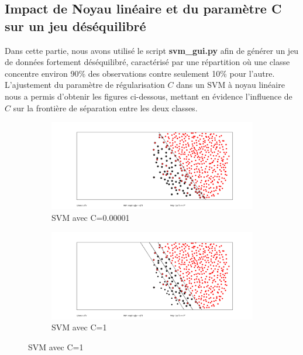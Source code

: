 \documentclass[12pt,a4paper]{report}
\begin{document}
\subsection{Impact de Noyau linéaire et du paramètre C sur un jeu déséquilibré}

Dans cette partie, nous avons utilisé le script \textbf{svm\_gui.py} 
afin de générer un 
jeu de données fortement déséquilibré, caractérisé par une répartition où une classe 
concentre environ 90\% des observations contre seulement 10\% pour l’autre. 
L’ajustement du paramètre de régularisation $C$ dans un SVM à noyau linéaire 
nous a permis d’obtenir les figures ci-dessous, mettant en évidence l’influence de $C$ 
sur la frontière de séparation entre les deux classes.
\begin{figure}[H]
    \centering
    \begin{subfigure}{0.45\linewidth}
        \centering
        \includegraphics[width=\linewidth]{images/c0.00001.png}
        \caption{SVM avec C=0.00001}
        \label{fig:c00001}
    \end{subfigure}
    \hfill
    \begin{subfigure}{0.45\linewidth}
        \centering
        \includegraphics[width=\linewidth]{images/c1.png}
        \caption{SVM avec C=1}
        \label{fig:c1}
    \end{subfigure}

    \vspace{0.5cm} %


\end{figure}
\end{document}
